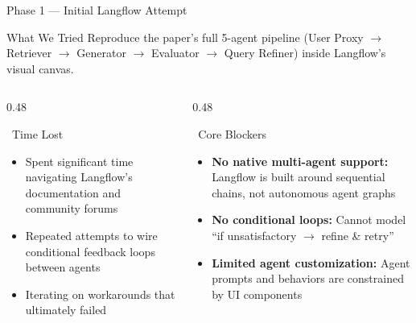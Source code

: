 \documentclass[aspectratio=169]{beamer}
\begin{document}
\begin{frame}{Phase 1 — Initial Langflow Attempt}
  \begin{block}{What We Tried}
    \small Reproduce the paper's full 5-agent pipeline (User Proxy $\to$ Retriever $\to$ Generator $\to$ Evaluator $\to$ Query Refiner) inside Langflow's visual canvas.
  \end{block}
  \vspace{0.3cm}
  \begin{columns}[T]
    \begin{column}{0.48\textwidth}
      \begin{alertblock}{\faClock\ Time Lost}
        \small
        \begin{itemize}
          \item Spent significant time navigating Langflow's documentation and community forums
          \item Repeated attempts to wire conditional feedback loops between agents
          \item Iterating on workarounds that ultimately failed
        \end{itemize}
      \end{alertblock}
    \end{column}
    \begin{column}{0.48\textwidth}
      \begin{alertblock}{\faBan\ Core Blockers}
        \small
        \begin{itemize}
          \item \textbf{No native multi-agent support:} Langflow is built around sequential chains, not autonomous agent graphs
          \item \textbf{No conditional loops:} Cannot model ``if unsatisfactory $\to$ refine \& retry''
          \item \textbf{Limited agent customization:} Agent prompts and behaviors are constrained by UI components
        \end{itemize}
      \end{alertblock}
    \end{column}
  \end{columns}
\end{frame}
\end{document}
